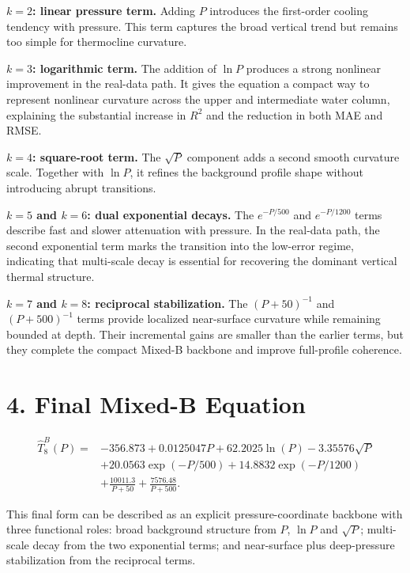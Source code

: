 \documentclass[10pt]{article}
\begin{document}
\vspace{0.25em}
\noindent\textbf{$k=2$: linear pressure term.}
Adding $P$ introduces the first-order cooling tendency with pressure.
This term captures the broad vertical trend but remains too simple for thermocline curvature.

\vspace{0.25em}
\noindent\textbf{$k=3$: logarithmic term.}
The addition of $\ln P$ produces a strong nonlinear improvement in the real-data path.
It gives the equation a compact way to represent nonlinear curvature across the upper and intermediate water column, explaining the substantial increase in $R^2$ and the reduction in both MAE and RMSE.

\vspace{0.25em}
\noindent\textbf{$k=4$: square-root term.}
The $\sqrt{P}$ component adds a second smooth curvature scale.
Together with $\ln P$, it refines the background profile shape without introducing abrupt transitions.

\vspace{0.25em}
\noindent\textbf{$k=5$ and $k=6$: dual exponential decays.}
The $e^{-P/500}$ and $e^{-P/1200}$ terms describe fast and slower attenuation with pressure.
In the real-data path, the second exponential term marks the transition into the low-error regime, indicating that multi-scale decay is essential for recovering the dominant vertical thermal structure.

\vspace{0.25em}
\noindent\textbf{$k=7$ and $k=8$: reciprocal stabilization.}
The $(P+50)^{-1}$ and $(P+500)^{-1}$ terms provide localized near-surface curvature while remaining bounded at depth.
Their incremental gains are smaller than the earlier terms, but they complete the compact Mixed-B backbone and improve full-profile coherence.

\section*{4. Final Mixed-B Equation}

\[
\begin{aligned}
\hat{T}_{8}^{B}(P)=&-356.873
+0.0125047P
+62.2025\ln(P)
-3.35576\sqrt{P} \\
&+20.0563\exp(-P/500)
+14.8832\exp(-P/1200) \\
&+\frac{10011.3}{P+50}
+\frac{7576.48}{P+500}.
\end{aligned}
\]

\noindent
This final form can be described as an explicit pressure-coordinate backbone with three functional roles: broad background structure from $P$, $\ln P$ and $\sqrt{P}$; multi-scale decay from the two exponential terms; and near-surface plus deep-pressure stabilization from the reciprocal terms.
\end{document}
